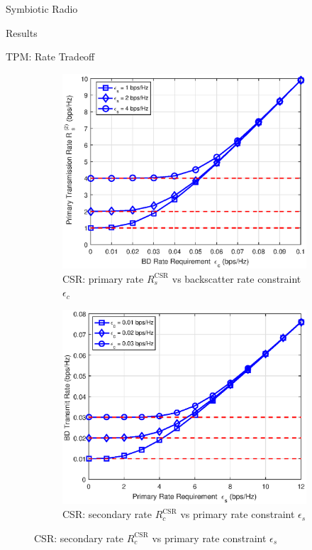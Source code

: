 \documentclass[9pt]{beamer}
\begin{document}
\begin{section}{Symbiotic Radio}
\begin{subsection}{Results}
\begin{frame}{TPM: Rate Tradeoff}
\begin{figure}
\begin{subfigure}{.48\textwidth}
						\includegraphics[width=0.8\linewidth]{assets/csr_rs_rc.eps}
						\caption{CSR: primary rate $R_{s}^{\text{CSR}}$ vs backscatter rate constraint $\epsilon_c$}
					\end{subfigure}
					\begin{subfigure}{.48\textwidth}
						\centering
						\includegraphics[width=0.8\linewidth]{assets/csr_rc_rs.eps}
						\caption{CSR: secondary rate $R_{c}^{\text{CSR}}$ vs primary rate constraint $\epsilon_s$}
					\end{subfigure}
				\end{figure}
			\end{frame}
		\end{subsection}


\end{section}
\end{document}
